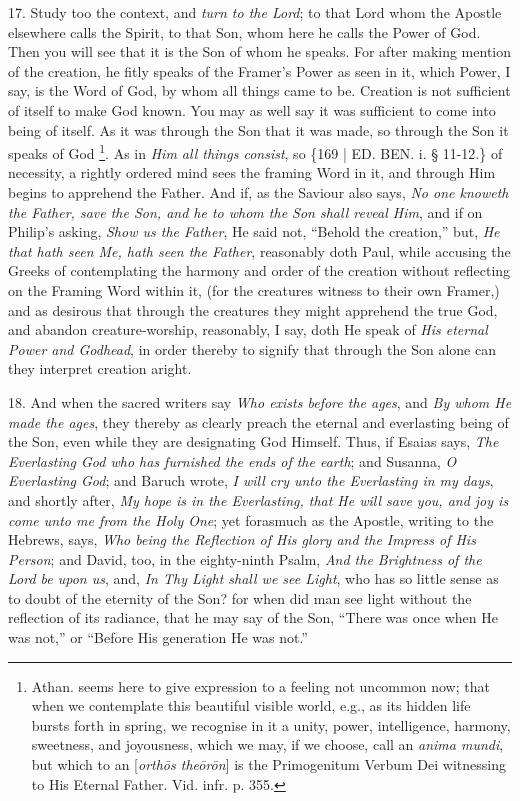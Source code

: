 17. Study too the context, and
\emph{turn to the Lord}; to that Lord whom the Apostle elsewhere calls
the Spirit, to that Son, whom here he calls the Power of God. Then you
will see that it is the Son of whom he speaks. For after making
mention of the creation, he fitly speaks of the Framer's Power as seen
in it, which Power, I say, is the Word of God, by whom all things came
to be. Creation is not sufficient of itself to make God known. You may
as well say it was sufficient to come into being of itself. As it was
through the Son that it was made, so through the Son it speaks of God
\footnote{Athan. seems here to give expression to a feeling not uncommon now;
that when we contemplate this beautiful visible world, e.g., as its
hidden life bursts forth in spring, we recognise in it a unity, power,
intelligence, harmony, sweetness, and joyousness, which we may, if we
choose, call an \emph{anima mundi}, but which to an [\emph{orth\={o}s
the\={o}r\={o}n}] is the Primogenitum Verbum Dei witnessing
to His Eternal Father. Vid. infr. p. 355.}. As in \emph{Him all
things consist}, so \{169 | ED.
BEN. i. § 11-12.\} of necessity, a rightly
ordered mind sees the framing Word in it, and through Him begins to
apprehend the Father. And if, as the Saviour also says, \emph{No one
knoweth the Father, save the Son, and he to whom the Son shall reveal
Him}, and if on Philip's asking, \emph{Show us the Father}, He said
not, ``Behold the creation,'' but, \emph{He that hath seen Me, hath seen
the Father}, reasonably doth Paul, while accusing the Greeks of
contemplating the harmony and order of the creation without reflecting
on the Framing Word within it, (for the creatures witness to their own
Framer,) and as desirous that through the creatures they might
apprehend the true God, and abandon creature-worship, reasonably, I
say, doth He speak of \emph{His eternal Power and Godhead}, in order
thereby to signify that through the Son alone can they interpret
creation aright.

18. And when the sacred
writers say \emph{Who exists before the ages}, and \emph{By whom He made
the ages}, they thereby as clearly preach the eternal and
everlasting being of the Son, even while they are designating God
Himself. Thus, if Esaias says, \emph{The Everlasting God who has
furnished the ends of the earth}; and Susanna, \emph{O Everlasting God};
and Baruch wrote, \emph{I will cry unto the Everlasting in my days},
and shortly after, \emph{My hope is in the Everlasting, that He will save
you, and joy is come unto me from the Holy One}; yet forasmuch as
the Apostle, writing to the Hebrews, says, \emph{Who being the Reflection
of His glory and the Impress of His Person}; and David, too, in the
eighty-ninth Psalm, \emph{And the Brightness of the Lord be upon us},
and, \emph{In Thy Light shall we see Light}, who has so little sense
as to doubt of the eternity of the Son? for when did man see light
without the reflection of its radiance, that he may say of the Son, ``There
was once when He was not,'' or ``Before His generation He was not.''

